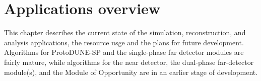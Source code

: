 \chapter{Applications overview}
\label{ch:appl}

This chapter describes the current state of the simulation, reconstruction, and analysis applications, the resource usge and the plans for future development.  Algorithms for ProtoDUNE-SP and the single-phase far detector modules are fairly mature, while algorithms for the near detector, the dual-phase far-detector module(s), and the Module of Opportunity are in an earlier stage of development.

\cleardoublepage








